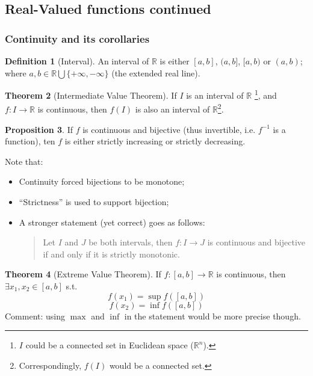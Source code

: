 \documentclass[12pt]{article}
\newcommand{\R}{{\mathbb R}}
\theoremstyle{definition}
\newtheorem{theorem}{Theorem}[section]
\newtheorem{definition}[theorem]{Definition}
\newtheorem{proposition}[theorem]{Proposition}
\theoremstyle{plain}
\begin{document}
\subsection{Real-Valued functions continued}
\setcounter{theorem}{0}

\subsubsection{Continuity and its corollaries}
\begin{definition}
    [Interval]
    An interval of $\R$ is either $[a,b]$, $(a,b]$, $[a,b)$ or $(a,b)$; where 
    $a, b \in \R\bigcup \{ +\infty, -\infty\}$ (the extended real line).
\end{definition}

\begin{theorem}
    [Intermediate Value Theorem]

    If $I$ is an interval of $\R$ \footnote{ $I$ could be a connected set 
    in Euclidean space ($\R^n$).}, and $f:I \to \R$ is continuous, then $f(I)$ is also an 
    interval of $\R$\footnote{Correspondingly, $f(I)$ would be a connected set.}.
\end{theorem}

\begin{proposition}
    If $f$ is continuous and bijective (thus invertible, i.e. $f^{-1}$ is a 
    function), ten $f$ is either strictly increasing or strictly decreasing.

    Note that: 
    \begin{itemize}
        \item Continuity forced bijections to be monotone;
        \item ``Strictness'' is used to support bijection;
        \item A stronger statement (yet correct) goes as follows: 
        \begin{quote}
            Let $I$ and $J$ be both intervals, then 
            $f:I \to J$ is continuous and bijective if and only if it is strictly 
            monotonic.
        \end{quote}
    \end{itemize}
\end{proposition}

\begin{theorem}
    [Extreme Value Theorem]
    If $f: [a,b] \to \R$ is continuous, then $\exists x_1, x_2 \in [a,b]$ s.t. 
    \[
        f(x_1) = \sup f([a,b])
    \]
    \[
        f(x_2) = \inf f([a,b])
    \]
    Comment: using $\max$ and $\inf$ in the statement would be more precise 
    though.
\end{theorem}
\end{document}
